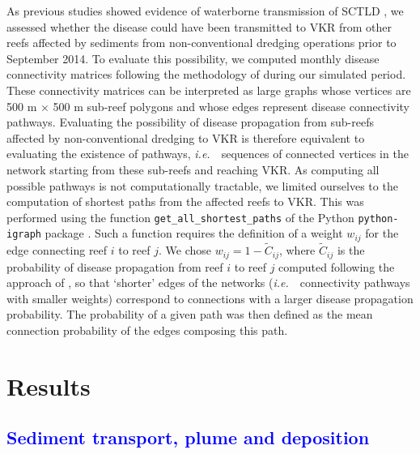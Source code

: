 \documentclass[preprint,12pt,authoryear]{elsarticle}
\newcommand{\ie}{{\it i.e.}\ }
\newcommand{\modif}[1]{\textcolor{blue}{#1}}
\begin{document}
As previous studies showed evidence of waterborne transmission of SCTLD \citep{aeby2019pathogenesis, dobbelaere2020coupled,eaton2021measuring, meiling2021variable}, we assessed whether the disease could have been transmitted to VKR from other reefs affected by sediments from non-conventional dredging operations prior to September 2014. To evaluate this possibility, we computed monthly disease connectivity matrices following the methodology of \cite{dobbelaere2020coupled} during our simulated period. These connectivity matrices can be interpreted as large graphs whose vertices are 500 m $\times$ 500 m sub-reef polygons and whose edges represent disease connectivity pathways. Evaluating the possibility of disease propagation from sub-reefs affected by non-conventional dredging to VKR is therefore equivalent to evaluating the existence of pathways, \ie~sequences of connected vertices in the network starting from these sub-reefs and reaching VKR. As computing all possible pathways is not computationally tractable, we limited ourselves to the computation of shortest paths from the affected reefs to VKR. This was performed using the function \texttt{get\_all\_shortest\_paths} of the Python \texttt{python-igraph} package \citep{csardi2006igraph}. Such a function requires the definition of a weight $w_{ij}$ for the edge connecting reef $i$ to reef $j$. We chose $w_{ij} = 1-\tilde{C}_{ij}$, where $\tilde{C}_{ij}$ is the probability of disease propagation from reef $i$ to reef $j$ computed following the approach of \cite{dobbelaere2020coupled}, so that `shorter' edges of the networks (\ie~connectivity pathways with smaller weights) correspond to connections with a larger disease propagation probability. The probability of a given path was then defined as the mean connection probability of the edges composing this path.


\section{Results}

\modif{\subsection{Sediment transport, plume and deposition}}
\end{document}
